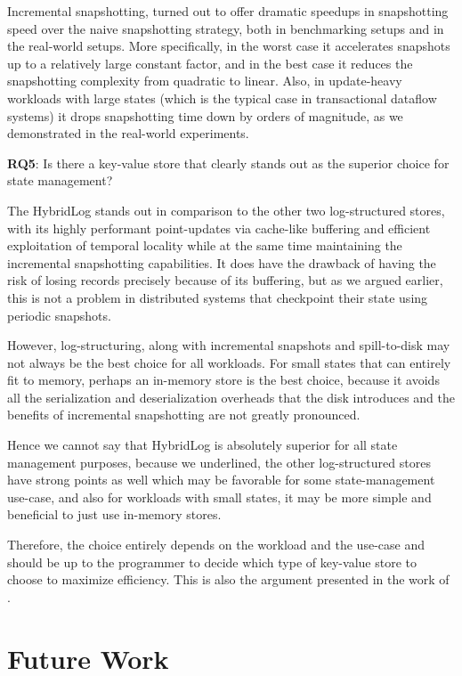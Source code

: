 Incremental snapshotting, turned out to offer dramatic speedups in snapshotting speed over the naive snapshotting strategy, both in benchmarking setups and in the real-world setups.
More specifically, in the worst case it accelerates snapshots up to a relatively large constant factor, and in the best case it reduces the snapshotting complexity from quadratic to linear.
Also, in update-heavy workloads with large states (which is the typical case in transactional dataflow systems) it drops snapshotting time down by orders of magnitude, as we demonstrated in the real-world experiments.

\begin{tcolorbox}
    \textbf{RQ5}: Is there a key-value store that clearly stands out as the superior choice for state management?
\end{tcolorbox}

The HybridLog stands out in comparison to the other two log-structured stores, with its highly performant point-updates via cache-like buffering and efficient exploitation of temporal locality while at the same time maintaining the incremental snapshotting capabilities. It does have the drawback of having the risk of losing records precisely because of its buffering, but as we argued earlier, this is not a problem in distributed systems that checkpoint their state using periodic snapshots.

However, log-structuring, along with incremental snapshots and spill-to-disk may not always be the best choice for all workloads. For small states that can entirely fit to memory, perhaps an in-memory store is the best choice, because it avoids all the serialization and deserialization overheads that the disk introduces and the benefits of incremental snapshotting are not greatly pronounced.

Hence we cannot say that HybridLog is absolutely superior for all state management purposes, because we underlined, the other log-structured stores have strong points as well which may be favorable for some state-management use-case, and also for workloads with small states, it may be more simple and beneficial to just use in-memory stores.

Therefore, the choice entirely depends on the workload and the use-case and should be up to the programmer to decide which type of key-value store to choose to maximize efficiency. This is also the argument presented in the work of \cite{workload-aware-streaming-state-management}.

\section{Future Work}

